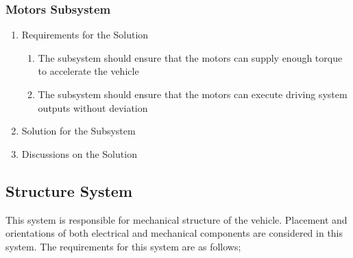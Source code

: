 \documentclass[a4paper,12pt]{article}
\begin{document}
	\subsubsection{Motors Subsystem}

		\begin{enumerate}
			\item {Requirements for the Solution}
			
			\begin{enumerate}
				\item The subsystem should ensure that the motors can supply enough torque to accelerate the vehicle 
				\item The subsystem should ensure that the motors can execute driving system outputs without deviation
			\end{enumerate} 

		\item {Solution for the Subsystem}

	
		\item {Discussions on the Solution}


	\end{enumerate}	





\subsection{Structure System}

	This system is responsible for mechanical structure of the vehicle. Placement and orientations of both electrical and mechanical components are considered in this system. The requirements for this system are as follows;
\end{document}
